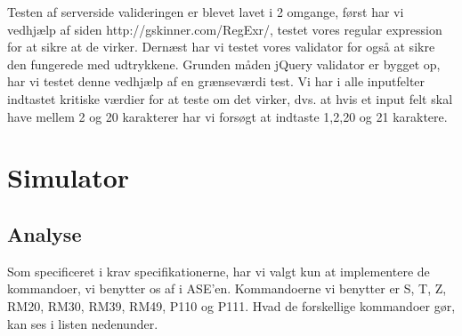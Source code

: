 \documentclass[a4paper]{article}
\begin{document}
Testen af serverside valideringen er blevet lavet i 2 omgange, først har vi vedhjælp af siden http://gskinner.com/RegExr/, testet vores regular expression for at sikre at de virker. Dernæst har vi testet vores validator for også at sikre den fungerede med udtrykkene. Grunden måden jQuery validator er bygget op, har vi testet denne vedhjælp af en grænseværdi test. Vi har i alle inputfelter indtastet kritiske værdier for at teste om det virker, dvs. at hvis et input felt skal have mellem 2 og 20 karakterer har vi forsøgt at indtaste 1,2,20 og 21 karaktere.  


\clearpage



\section{Simulator} %

\subsection{Analyse} %

Som specificeret i krav specifikationerne, har vi valgt kun at implementere de kommandoer, vi benytter os af i ASE’en. Kommandoerne vi benytter er S, T, Z, RM20, RM30, RM39, RM49, P110 og P111. Hvad de forskellige kommandoer gør, kan ses i listen nedenunder.
\end{document}
